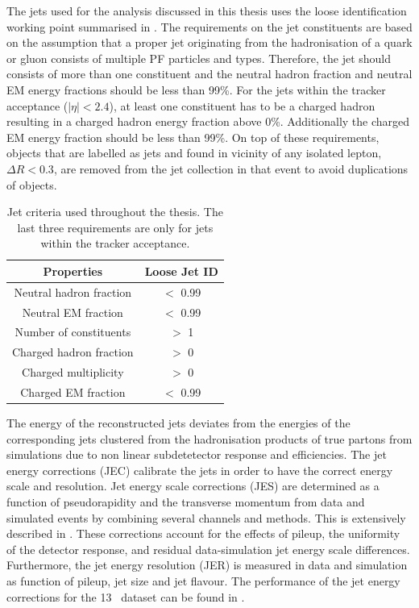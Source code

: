 The jets used for the analysis discussed in this thesis uses the loose identification working point summarised in . The requirements on the jet constituents are based on the assumption that a proper jet originating from the hadronisation of a quark or gluon consists of multiple PF particles and types. Therefore, the jet should consists of more than one constituent and the neutral hadron fraction and neutral EM energy fractions should be less than 99\%. For the jets within the tracker acceptance ($|\eta|<2.4$), at least one constituent has to be a charged hadron resulting in a charged hadron energy fraction above 0\%. Additionally the charged EM energy fraction should be less than 99\%. On top of these requirements, objects that are labelled as jets and found in vicinity of any isolated lepton, $\Delta R < 0.3$, are removed from the jet collection in that event to avoid duplications of objects. 
\begin{table}[h]
	\centering
	\caption{Jet criteria used throughout the thesis. The last three requirements are only for jets within the tracker acceptance.}
	\begin{tabular}{cc}
		\toprule 
		Properties & Loose Jet ID \\ 
		\midrule
		Neutral hadron fraction & $<$ 0.99 \\ 
		
		Neutral EM fraction & $<$ 0.99 \\ 
		
		Number of constituents & $>$ 1 \\ 
		 		
		Charged hadron fraction & $>$ 0 \\ 
	 
		Charged multiplicity & $>$ 0 \\ 
		
		Charged EM fraction & $<$ 0.99 \\ 
		\bottomrule
	\end{tabular} 
	\label{tab:jetID}
\end{table}

The energy of the reconstructed jets deviates from the energies of the corresponding jets clustered from the hadronisation products of true partons from simulations due to non linear subdetetector response and efficiencies. The jet energy corrections (JEC) calibrate the jets in order to have the correct energy scale and resolution.
Jet energy scale corrections (JES) are determined as a function of pseudorapidity and the transverse momentum from data and simulated events by combining several channels and methods. This is extensively described in \cite{1748-0221-12-02-P02014}. These corrections account for the effects of pileup, the uniformity of the detector response, and residual data-simulation jet energy scale differences. Furthermore, the jet energy resolution (JER) is measured in data and simulation as function of pileup, jet size and jet flavour.  %
 The performance of the jet energy corrections for the 13 \TeV\ dataset can be found in \cite{CMS-DP-2016-020}.


